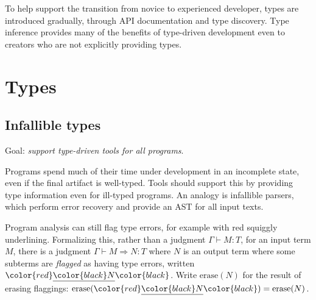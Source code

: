 \documentclass[acmsmall]{acmart}
\newcommand{\squnder}[1]{\color{red}\underline{{\color{black}#1}}\color{black}}
\newcommand{\infer}[2]{\frac{\textstyle#1}{\textstyle#2}}
\newcommand{\erase}{\mathrm{erase}}
\begin{document}
To help support the transition from novice to experienced developer,
types are introduced gradually, through API documentation and type discovery.
Type inference provides many of the benefits of type-driven development
even to creators who are not explicitly providing types.

\section{Types}
\subsection{Infallible types}

Goal: \emph{support type-driven tools for all programs}.

Programs spend much of their time under development in an incomplete state, even if the final artifact
is well-typed. Tools should support this by providing type information even for ill-typed programs.
An analogy is infallible parsers, which perform error recovery and provide an AST for all input texts.

Program analysis can still flag type errors, for example with red
squiggly underlining. Formalizing this, rather than a judgment
$\Gamma\vdash M:T$, for an input term $M$, there is a judgment
$\Gamma \vdash M \Rightarrow N : T$ where $N$ is an output term
where some subterms are \emph{flagged} as having type errors, written $\squnder{N}$. Write $\erase(N)$
for the result of erasing flaggings: $\erase(\squnder{N}) = \erase(N)$.

\end{document}

